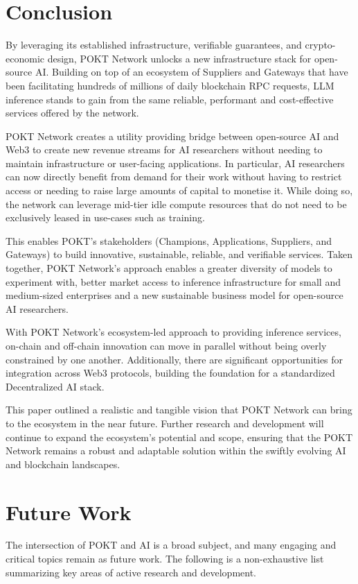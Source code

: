 \documentclass[conference,compsoc]{IEEEtran}
\begin{document}
\section{Conclusion}
By leveraging its established infrastructure, verifiable guarantees, and crypto-economic design, POKT Network unlocks a new infrastructure stack for open-source AI. Building on top of an ecosystem of Suppliers and Gateways that have been facilitating hundreds of millions of daily blockchain RPC requests, LLM inference stands to gain from the same reliable, performant and cost-effective services offered by the network.

POKT Network creates a utility providing bridge between open-source AI and Web3 to create new revenue streams for AI researchers without needing to maintain infrastructure or user-facing applications. In particular, AI researchers can now directly benefit from demand for their work without having to restrict access or needing to raise large amounts of capital to monetise it. While doing so, the network can leverage mid-tier idle compute resources that do not need to be exclusively leased in use-cases such as training.

This enables POKT's stakeholders (Champions, Applications, Suppliers, and Gateways) to build innovative, sustainable, reliable, and verifiable services. Taken together, POKT Network’s approach enables a greater diversity of models to experiment with, better market access to inference infrastructure for small and medium-sized enterprises and a new sustainable business model for open-source AI researchers.

With POKT Network’s ecosystem-led approach to providing inference services, on-chain and off-chain innovation can move in parallel without being overly constrained by one another. Additionally, there are significant opportunities for integration across Web3 protocols, building the foundation for a standardized Decentralized AI stack.

This paper outlined a realistic and tangible vision that POKT Network can bring to the ecosystem in the near future. Further research and development will continue to expand the ecosystem's potential and scope, ensuring that the POKT Network remains a robust and adaptable solution within the swiftly evolving AI and blockchain landscapes.

\section{Future Work}
The intersection of POKT and AI is a broad subject, and many engaging and critical topics remain as future work. The following is a non-exhaustive list summarizing key areas of active research and development.
\end{document}
